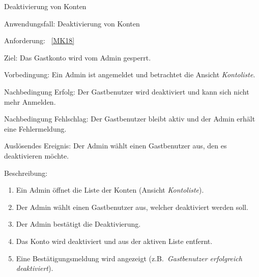 \begin{function}{60}{Deaktivierung von Konten}
    \item[Anwendungsfall:] Deaktivierung von Konten
    \item[Anforderung:] ~\ref{MK18}
    \item[Ziel:] Das Gastkonto wird vom Admin gesperrt.
    \item[Vorbedingung:] Ein Admin ist angemeldet und betrachtet die Ansicht \textit{Kontoliste}.
    \item[Nachbedingung Erfolg:] Der Gastbenutzer wird deaktiviert und kann sich nicht mehr Anmelden.
    \item[Nachbedingung Fehlschlag:] Der Gastbenutzer bleibt aktiv und der Admin erhält eine Fehlermeldung.
    \item[Auslösendes Ereignis:] Der Admin wählt einen Gastbenutzer aus, den es deaktivieren möchte.
    \item[Beschreibung:] ~
    \begin{enumerate}
        \item Ein Admin öffnet die Liste der Konten (Ansicht \textit{Kontoliste}).
        \item Der Admin wählt einen Gastbenutzer aus, welcher deaktiviert werden soll.
        \item Der Admin bestätigt die Deaktivierung.
        \item Das Konto wird deaktiviert und aus der aktiven Liste entfernt.
        \item Eine Bestätigungsmeldung wird angezeigt (z.B.\ \textit{Gastbenutzer erfolgreich deaktiviert}).
    \end{enumerate}
\end{function}

\pagebreak

